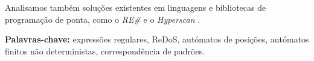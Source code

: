 \noindent Analisamos também soluções existentes em linguagens e bibliotecas de programação de ponta, como o \emph{RE\#} \cite{resharp_tool_paper} e o \emph{Hyperscan} \cite{hyperscan_paper}.

\textbf{Palavras-chave:} expressões regulares, ReDoS, autómatos de posições, autómatos finitos não deterministas, correspondência de padrões.